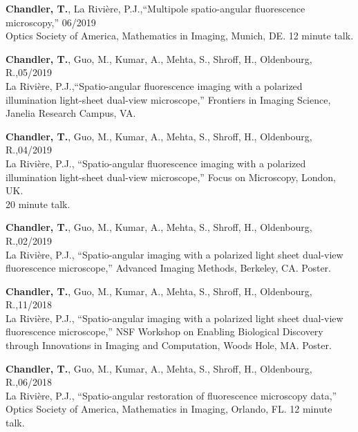 \documentclass[12pt,letterpaper]{article}
\begin{document}
\begin{benumerate}{8}
\item {\textbf{Chandler, T.}, La Rivi\`ere, P.J.,``Multipole spatio-angular fluorescence microscopy,'' \hfill 06/2019\\ Optics Society of America, Mathematics in Imaging, Munich, DE. 12 minute talk.}
  
\item {\textbf{Chandler, T.}, Guo, M., Kumar, A., Mehta, S., Shroff, H., Oldenbourg, R.,\hfill 05/2019\\ La Rivi\`ere, P.J.,``Spatio-angular fluorescence imaging with a polarized\\ illumination light-sheet dual-view microscope,'' Frontiers in Imaging Science,\\ Janelia Research Campus, VA.}
  
\item {\textbf{Chandler, T.}, Guo, M., Kumar, A., Mehta, S., Shroff, H., Oldenbourg, R.,\hfill 04/2019\\ La Rivi\`ere, P.J., ``Spatio-angular fluorescence imaging with a polarized\\ illumination light-sheet dual-view microscope,'' Focus on Microscopy, London, UK.\\ 20 minute talk.}
  
\item {\textbf{Chandler, T.}, Guo, M., Kumar, A., Mehta, S., Shroff, H., Oldenbourg, R.,\hfill 02/2019\\ La Rivi\`ere, P.J., ``Spatio-angular imaging with a polarized light sheet dual-view\\ fluorescence microscope,'' Advanced Imaging Methods, Berkeley, CA. Poster.}

\item {\textbf{Chandler, T.}, Guo, M., Kumar, A., Mehta, S., Shroff, H., Oldenbourg, R.,\hfill 11/2018\\ La Rivi\`ere, P.J., ``Spatio-angular imaging with a polarized light sheet dual-view \\ fluorescence microscope,'' NSF Workshop on Enabling Biological Discovery\\ through Innovations in Imaging and Computation, Woods Hole, MA. Poster.}
  
\item {\textbf{Chandler, T.}, Guo, M., Kumar, A., Mehta, S., Shroff, H., Oldenbourg, R.,\hfill 06/2018\\ La Rivi\`ere, P.J., ``Spatio-angular restoration of fluorescence microscopy data,'' \\
      Optics Society of America, Mathematics in Imaging, Orlando, FL. 12 minute talk.}
  

\end{benumerate}
\end{document}
